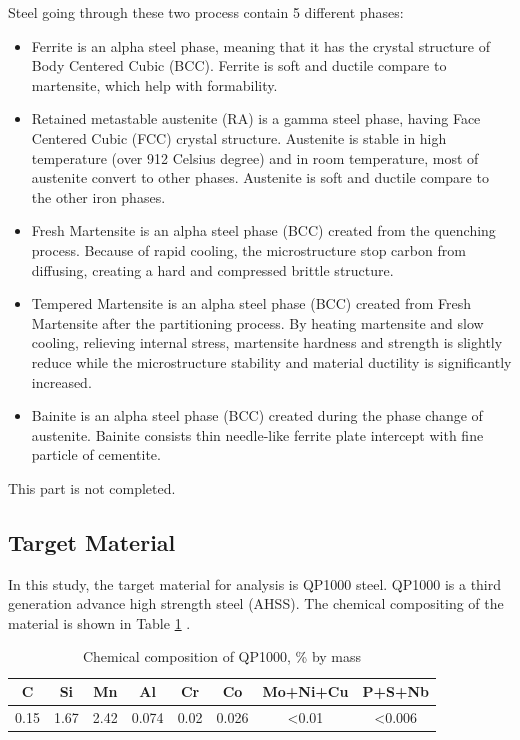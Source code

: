 %
Steel going through these two process contain 5 different phases: 

\begin{itemize}
    
    \item Ferrite is an alpha steel phase, meaning that it has the crystal structure of Body Centered Cubic (BCC). Ferrite is soft and ductile compare to martensite, which help with formability.
    
    \item Retained metastable austenite (RA) is a gamma steel phase, having Face Centered Cubic (FCC) crystal structure. Austenite is stable in high temperature (over 912 Celsius degree) and in room temperature, most of austenite convert to other phases. Austenite is soft and ductile compare to the other iron phases.
    
    \item Fresh Martensite is an alpha steel phase (BCC) created from the quenching process. Because of rapid cooling, the microstructure stop carbon from diffusing, creating a hard and compressed brittle structure.
    
    \item Tempered Martensite is an alpha steel phase (BCC) created from Fresh Martensite after the partitioning process. By heating martensite and slow cooling, relieving internal stress, martensite hardness and strength is slightly reduce while the microstructure stability and material ductility is significantly increased.
    
    \item Bainite is an alpha steel phase (BCC) created during the phase change of austenite. Bainite consists thin needle-like ferrite plate intercept with fine particle of cementite. 

\end{itemize}
This part is not completed.
\\
\subsection{Target Material}
 In this study, the target material for analysis is QP1000 steel. QP1000 is a third generation advance high strength steel (AHSS).  The chemical compositing of the material is shown in Table \ref{chemcomp} \cite{QPprop}.

\begin{table}[h]
    \centering
    \captionsetup{justification=centering,margin=2cm}
    \caption{Chemical composition of QP1000, \% by mass}
    \begin{tabular}{| c | c | c | c | c | c | c | c |}
         \hline
         C & Si & Mn & Al & Cr & Co & Mo+Ni+Cu & P+S+Nb \\
         \hline
          0.15 & 1.67 & 2.42 & 0.074 & 0.02 & 0.026 & <0.01 & <0.006\\
         \hline
         
    \end{tabular}
    \label{chemcomp}
\end{table}

